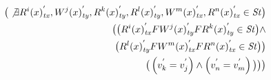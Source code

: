 \documentclass{sig-alternate-05-2015}
\begin{document}
\begin{align}
\begin{split}
    \big( \not\exists {R^i}(x)^{'}_\mathit{tx}, {W^j}(x)^{'}_\mathit{ty}, {R^k}(x)^{'}_\mathit{ty}, {R^l}(x)^{'}_\mathit{ty}, {W^m}(x)^{'}_\mathit{tx}, {R^n}(x)^{'}_\mathit{tx} \in \mathit{St} \big)  \\
     \big( \big( {R^i}(x)^{'}_\mathit{tx} F {W^j}(x)^{'}_\mathit{ty} F {R^k}(x)^{'}_\mathit{ty} \in \mathit{St} \big) \wedge \\
  \big(  {R^l}(x)^{'}_\mathit{ty} F {W^m}(x)^{'}_\mathit{tx} F {R^n}(x)^{'}_\mathit{tx} \in \mathit{St} \big)  \big)  \\
  \big(  \left( v_k^{'} = v_j^{'} \right) \wedge
 \left( v_n^{'} = v_m^{'} \right) \big) \big) \big)
\end{split}
  \end{align}
  
\end{document}
